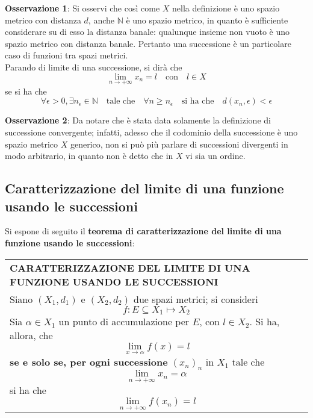 \documentclass[a4paper]{extarticle}
\renewcommand\arraystretch{}
\begin{document}
\vspace{2em}
\noindent
\textbf{Osservazione 1}: Si osservi che così come $X$ nella definizione è uno spazio metrico con distanza $d$, anche $\mathbb{N}$ è uno spazio metrico, in quanto è sufficiente considerare su di esso la distanza banale: qualunque insieme non vuoto è uno spazio metrico con distanza banale. Pertanto una successione è un particolare caso di funzioni tra spazi metrici.\\
Parando di limite di una successione, si dirà che
\[\lim_{n \to +\infty} x_n = l \hspace{1em} \text{con} \hspace{1em} l \in X\]
se si ha che
\[\forall \epsilon > 0, \exists n_\epsilon \in \mathbb{N} \hspace{1em} \text{tale che} \hspace{1em} \forall n \geq n_\epsilon \hspace{1em} \text{si ha che} \hspace{1em} d(x_n,\epsilon) < \epsilon\]

\vspace{2em}
\noindent
\textbf{Osservazione 2}: Da notare che è stata data solamente la definizione di successione convergente; infatti, adesso che il codominio della successione è uno spazio metrico $X$ generico, non si può più parlare di successioni divergenti in modo arbitrario, in quanto non è detto che in $X$ vi sia un ordine.

\vspace{1em}
\noindent
\subsection{Caratterizzazione del limite di una funzione usando le successioni}
Si espone di seguito il \textbf{teorema di caratterizzazione del limite di una funzione usando le successioni}:

\vspace{1em}
\setlength{\tabcolsep}{14pt}
\renewcommand{\arraystretch}{2}
\noindent
\begin{tabularx}{\textwidth}{@{}|P|@{}}
    \hline
    {\textbf{CARATTERIZZAZIONE DEL LIMITE DI UNA FUNZIONE USANDO LE SUCCESSIONI}}\\
    \parbox{\linewidth}{Siano $(X_1,d_1)$ e $(X_2,d_2)$ due spazi metrici; si consideri
    \[f : E \subseteq X_1 \longmapsto X_2\]
    Sia $\alpha \in X_1$ un punto di accumulazione per $E$, con $l \in X_2$. Si ha, allora, che
    \[\lim_{x \to \alpha} f(x) = l\]
    \textbf{se e solo se, per ogni successione} $(x_n)_n$ in $X_1$ tale che
    \[\lim_{n \to +\infty} x_n = \alpha\]
    si ha che
    \[\lim_{n \to +\infty} f(x_n) = l\]
    \vspace{-1mm}}\\
    \hline
\end{tabularx}
\end{document}
